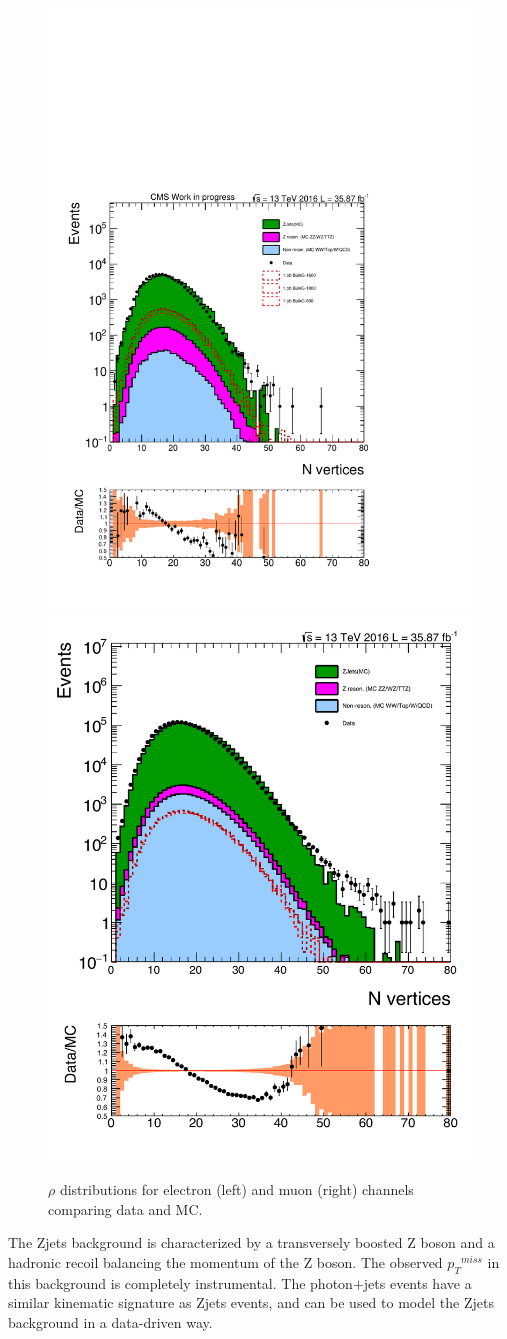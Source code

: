 \begin{figure}[htbp!]
\centering
\includegraphics[width=0.46\linewidth, page=2]{figures/ReMiniSummer16_MC_GMCPhPtWt_tightzpt50_puWeightsummer16_metfilter_unblind_el_log_1pb.pdf}
\includegraphics[width=0.46\linewidth, page=2]{figures/ReMiniSummer16_MC_GMCPhPtWt_tightzpt50_puWeightsummer16_metfilter_unblind_mu_log_1pb.pdf}
\caption{$\rho$ distributions for electron (left) and muon (right) channels comparing data and MC.}
\label{fig:mc_rho}
\end{figure}

\vspace{0.3cm}
The Zjets background is characterized by a transversely boosted Z boson and a hadronic recoil balancing the momentum of the Z boson. The observed ${p_{T}}^{miss}$ in this background is completely instrumental. The photon$+$jets events have a similar kinematic signature as Zjets events, and can be used to model the Zjets background in a data-driven way.

